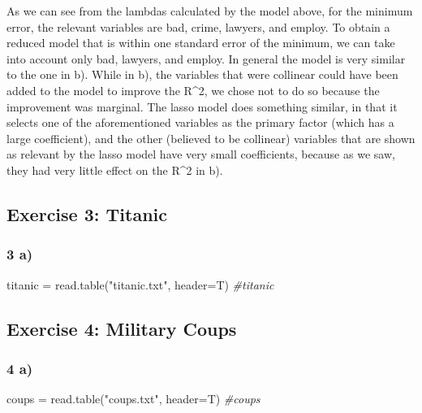\documentclass[
  11pt,
]{article}
\newenvironment{Shaded}{\begin{snugshade}}{\end{snugshade}}
\newcommand{\AttributeTok}[1]{\textcolor[rgb]{0.77,0.63,0.00}{#1}}
\newcommand{\CommentTok}[1]{\textcolor[rgb]{0.56,0.35,0.01}{\textit{#1}}}
\newcommand{\FunctionTok}[1]{\textcolor[rgb]{0.00,0.00,0.00}{#1}}
\newcommand{\NormalTok}[1]{#1}
\newcommand{\OtherTok}[1]{\textcolor[rgb]{0.56,0.35,0.01}{#1}}
\newcommand{\StringTok}[1]{\textcolor[rgb]{0.31,0.60,0.02}{#1}}
\begin{document}
As we can see from the lambdas calculated by the model above, for the
minimum error, the relevant variables are bad, crime, lawyers, and
employ. To obtain a reduced model that is within one standard error of
the minimum, we can take into account only bad, lawyers, and employ. In
general the model is very similar to the one in b). While in b), the
variables that were collinear could have been added to the model to
improve the R\^{}2, we chose not to do so because the improvement was
marginal. The lasso model does something similar, in that it selects one
of the aforementioned variables as the primary factor (which has a large
coefficient), and the other (believed to be collinear) variables that
are shown as relevant by the lasso model have very small coefficients,
because as we saw, they had very little effect on the R\^{}2 in b).

\hypertarget{exercise-3-titanic}{%
\subsection{Exercise 3: Titanic}\label{exercise-3-titanic}}

\hypertarget{a-2}{%
\subsubsection{3 a)}\label{a-2}}

\begin{Shaded}
\begin{Highlighting}[]
\NormalTok{titanic }\OtherTok{=} \FunctionTok{read.table}\NormalTok{(}\StringTok{"titanic.txt"}\NormalTok{, }\AttributeTok{header=}\NormalTok{T)}
\CommentTok{\#titanic}
\end{Highlighting}
\end{Shaded}

\hypertarget{exercise-4-military-coups}{%
\subsection{Exercise 4: Military
Coups}\label{exercise-4-military-coups}}

\hypertarget{a-3}{%
\subsubsection{4 a)}\label{a-3}}

\begin{Shaded}
\begin{Highlighting}[]
\NormalTok{coups }\OtherTok{=} \FunctionTok{read.table}\NormalTok{(}\StringTok{"coups.txt"}\NormalTok{, }\AttributeTok{header=}\NormalTok{T)}
\CommentTok{\#coups}
\end{Highlighting}
\end{Shaded}
\end{document}
